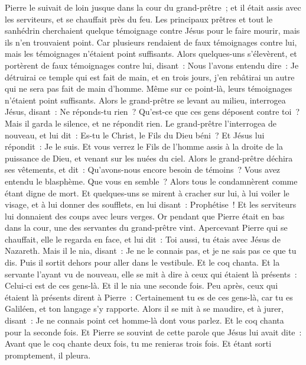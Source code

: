 \begin{multicols}{2}
Pierre le suivait de loin jusque dans la cour du grand-prêtre~; et il était assis avec les serviteurs, et se chauffait près du feu.
Les principaux prêtres et tout le sanhédrin cherchaient quelque témoignage contre Jésus pour le faire mourir, mais ils n'en trouvaient point.
Car plusieurs rendaient de faux témoignages contre lui, mais les témoignages n'étaient point suffisants.
Alors quelques-uns s'élevèrent, et portèrent de faux témoignages contre lui, disant~:
Nous l'avons entendu dire~: Je détruirai ce temple qui est fait de main, et en trois jours, j'en rebâtirai un autre qui ne sera pas fait de main d'homme.
Même sur ce point-là, leurs témoignages n'étaient point suffisants.
Alors le grand-prêtre se levant au milieu, interrogea Jésus, disant~: Ne réponds-tu rien~? Qu'est-ce que ces gens déposent contre toi~?
Mais il garda le silence, et ne répondit rien. Le grand-prêtre l'interrogea de nouveau, et lui dit~: Es-tu le Christ, le Fils du Dieu béni~?
Et Jésus lui répondit~: Je le suis. Et vous verrez le Fils de l'homme assis à la droite de la puissance de Dieu, et venant sur les nuées du ciel.
Alors le grand-prêtre déchira ses vêtements, et dit~: Qu'avons-nous encore besoin de témoins~?
Vous avez entendu le blasphème. Que vous en semble~? Alors tous le condamnèrent comme étant digne de mort.
Et quelques-uns se mirent à cracher sur lui, à lui voiler le visage, et à lui donner des soufflets, en lui disant~: Prophétise~! Et les serviteurs lui donnaient des coups avec leurs verges.
Or pendant que Pierre était en bas dans la cour, une des servantes du grand-prêtre vint.
Apercevant Pierre qui se chauffait, elle le regarda en face, et lui dit~: Toi aussi, tu étais avec Jésus de Nazareth.
Mais il le nia, disant~: Je ne le connais pas, et je ne sais pas ce que tu dis. Puis il sortit dehors pour aller dans le vestibule. Et le coq chanta.
Et la servante l'ayant vu de nouveau, elle se mit à dire à ceux qui étaient là présents~: Celui-ci est de ces gens-là. Et il le nia une seconde fois.
Peu après, ceux qui étaient là présents dirent à Pierre~: Certainement tu es de ces gens-là, car tu es Galiléen, et ton langage s'y rapporte.
Alors il se mit à se maudire, et à jurer, disant~: Je ne connais point cet homme-là dont vous parlez.
Et le coq chanta pour la seconde fois. Et Pierre se souvint de cette parole que Jésus lui avait dite~: Avant que le coq chante deux fois, tu me renieras trois fois. Et étant sorti promptement, il pleura.

\end{multicols}
